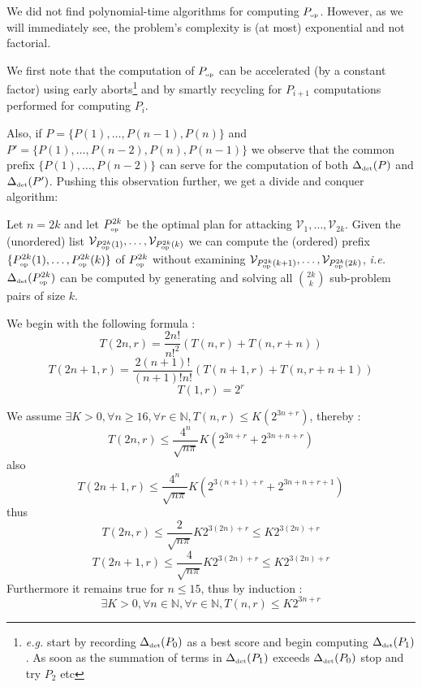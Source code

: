 \documentclass[11pt]{llncs}
\begin{document}


We did not find polynomial-time algorithms for computing $P_{\mbox{{\tiny op}}}$. However, as we will immediately see, the problem's complexity is (at most) exponential and not factorial.\smallskip

We first note that the computation of $P_{\mbox{{\tiny op}}}$ can be accelerated (by a constant factor) using early aborts\footnote{{\sl e.g.} start by recording $\Delta_{\mbox{{\tiny det}}}(P_0)$ as a best score and begin computing $\Delta_{\mbox{{\tiny det}}}(P_1)$. As soon as the summation of terms in $\Delta_{\mbox{{\tiny det}}}(P_1)$ exceeds $\Delta_{\mbox{{\tiny det}}}(P_0)$ stop and try $P_2$ etc} and by smartly recycling for $P_{i+1}$ computations performed for computing $P_i$.\smallskip

Also, if $P=\{P(1),\ldots,P(n-1),P(n)\}$ and $P'=\{P(1),\ldots,P(n-2),P(n),P(n-1)\}$ we observe that the common prefix $\{P(1),\ldots,P(n-2)\}$ can serve for the computation of both $\Delta_{\mbox{{\tiny det}}}(P)$ and $\Delta_{\mbox{{\tiny det}}}(P')$. Pushing this observation further, we get a divide and conquer algorithm: \smallskip

Let $n=2k$ and let $P_{\mbox{{\tiny op}}}^{2k}$ be the optimal plan for attacking $\mathcal{V}_1,\ldots,\mathcal{V}_{2k}$. Given the (unordered) list $\mathcal{V}_{P_{\mbox{{\tiny op}}}^{2k}(1)},\ldots,\mathcal{V}_{P_{\mbox{{\tiny op}}}^{2k}(k)}$ we can compute the (ordered) prefix $\{P_{\mbox{{\tiny op}}}^{2k}(1),\ldots,P_{\mbox{{\tiny op}}}^{2k}(k)\}$ of $P_{\mbox{{\tiny op}}}^{2k}$ without examining $\mathcal{V}_{P_{\mbox{{\tiny op}}}^{2k}(k+1)},\ldots,\mathcal{V}_{P_{\mbox{{\tiny op}}}^{2k}(2k)}$, {\sl i.e.} $\Delta_{\mbox{{\tiny det}}}(P_{\mbox{{\tiny op}}}^{2k})$ can be computed by generating and solving all $\binom{2k}{k}$ sub-problem pairs of size $k$.\smallskip

We begin with the following formula :
\[
	T(2n, r) = \frac{2n!}{n!^2}(T(n, r)+T(n, r+n))
\]
\[
	T(2n+1, r) = \frac{2(n+1)!}{(n+1)!n!}(T(n+1, r)+T(n, r+n+1))
\]
\[
	T(1, r) = 2^r
\]

We assume $\exists K > 0, \forall n \geqslant 16, \forall r \in \mathbb{N}, T(n, r) \leqslant K(2^{3n+r})$, thereby :
\[
	T(2n, r) \leqslant \frac{4^n}{\sqrt{n\pi}}K(2^{3n+r}+2^{3n+n+r})
\]
also
\[
	T(2n+1, r) \leqslant \frac{4^n}{\sqrt{n\pi}}K(2^{3(n+1)+r}+2^{3n+n+r+1})
\]
thus
\[
	T(2n, r) \leqslant \frac{2}{\sqrt{n\pi}}K2^{3(2n)+r} \leqslant K2^{3(2n)+r}
\]
\[
	T(2n+1, r) \leqslant \frac{4}{\sqrt{n\pi}}K2^{3(2n)+r} \leqslant K2^{3(2n)+r}
\]
Furthermore it remains true for $n \leqslant 15$, thus by induction : 
\[
	 \exists K > 0, \forall n \in \mathbb{N}, \forall r \in \mathbb{N}, T(n, r) \leqslant K 2^{3n+r}
\]
\end{document}
